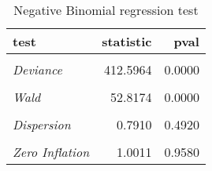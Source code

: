 \begin{table}[ht]

\caption{\label{tab:negbin_reg_tests}Negative Binomial regression test}
\centering
\begin{tabular}[t]{>{}lrr}
\toprule
test & statistic & pval\\
\midrule
\em{\cellcolor{gray!6}{Pearson}} & \cellcolor{gray!6}{1424.0269} & \cellcolor{gray!6}{0.0120}\\
\em{Deviance} & 412.5964 & 0.0000\\
\em{\cellcolor{gray!6}{LR}} & \cellcolor{gray!6}{58.9751} & \cellcolor{gray!6}{0.0000}\\
\em{Wald} & 52.8174 & 0.0000\\
\em{\cellcolor{gray!6}{Bootstrap Outliers}} & \cellcolor{gray!6}{0.0008} & \cellcolor{gray!6}{1.0000}\\
\addlinespace
\em{Dispersion} & 0.7910 & 0.4920\\
\em{\cellcolor{gray!6}{K-S Uniformity}} & \cellcolor{gray!6}{0.0217} & \cellcolor{gray!6}{0.5692}\\
\em{Zero Inflation} & 1.0011 & 0.9580\\
\bottomrule
\end{tabular}
\end{table}
